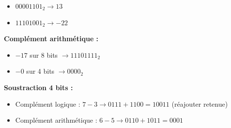 \documentclass[a4paper,12pt]{article}
\begin{document}
\begin{itemize} 

    \item $00001101_2 \rightarrow 13$ 

    \item $11101001_2 \rightarrow -22$ 

\end{itemize} 

  

\textbf{Complément arithmétique :}   

\begin{itemize} 

    \item $-17$ sur 8 bits $\rightarrow 11101111_2$ 

    \item $-0$ sur 4 bits $\rightarrow 0000_2$ 

\end{itemize} 

  

\textbf{Soustraction 4 bits :}   

\begin{itemize} 

    \item Complément logique : $7 - 3 \rightarrow 0111 + 1100 = 1 0011$ (réajouter retenue) 

    \item Complément arithmétique : $6 - 5 \rightarrow 0110 + 1011 = 0001$ 

\end{itemize} 

  
\end{document}
